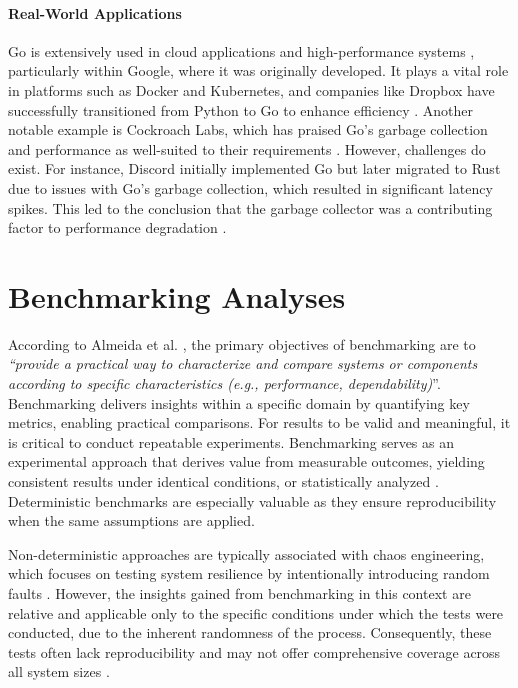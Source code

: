 \paragraph{Real-World Applications} Go is extensively used in cloud applications and high-performance systems \cite{Zhao2023}, particularly within Google, where it was originally developed. It plays a vital role in platforms such as Docker and Kubernetes, and companies like Dropbox have successfully transitioned from Python to Go to enhance efficiency \cite{go-docs}. Another notable example is Cockroach Labs, which has praised Go's garbage collection and performance as well-suited to their requirements \cite{go-docs}. However, challenges do exist. For instance, Discord initially implemented Go but later migrated to Rust due to issues with Go's garbage collection, which resulted in significant latency spikes. This led to the conclusion that the garbage collector was a contributing factor to performance degradation \cite{discord-blog-rust-go}.

\section{Benchmarking Analyses}

According to Almeida et al. \cite{Almeida2013}, the primary objectives of benchmarking are to \textit{“provide a practical way to characterize and compare systems or components according to specific characteristics (e.g., performance, dependability)}”. Benchmarking delivers insights within a specific domain by quantifying key metrics, enabling practical comparisons. For results to be valid and meaningful, it is critical to conduct repeatable experiments. Benchmarking serves as an experimental approach that derives value from measurable outcomes, yielding consistent results under identical conditions, or statistically analyzed \cite{Almeida2013, Blessing2019}. Deterministic benchmarks are especially valuable as they ensure reproducibility when the same assumptions are applied.

Non-deterministic approaches are typically associated with chaos engineering, which focuses on testing system resilience by intentionally introducing random faults \cite{Randtoul2022}. However, the insights gained from benchmarking in this context are relative and applicable only to the specific conditions under which the tests were conducted, due to the inherent randomness of the process. Consequently, these tests often lack reproducibility and may not offer comprehensive coverage across all system sizes \cite{Almeida2013}.

